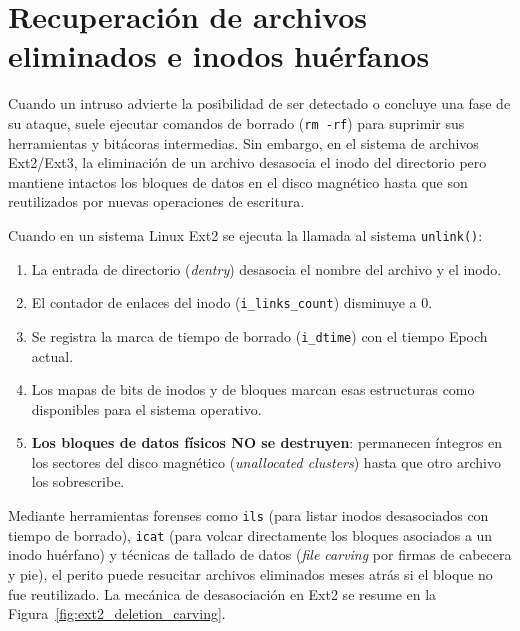\chapter{Recuperación de archivos eliminados e inodos huérfanos}

Cuando un intruso advierte la posibilidad de ser detectado o concluye una fase de su ataque, suele ejecutar comandos de borrado (\texttt{rm -rf}) para suprimir sus herramientas y bitácoras intermedias. Sin embargo, en el sistema de archivos Ext2/Ext3, la eliminación de un archivo desasocia el inodo del directorio pero mantiene intactos los bloques de datos en el disco magnético hasta que son reutilizados por nuevas operaciones de escritura.

\begin{notaforense}
Cuando en un sistema Linux Ext2 se ejecuta la llamada al sistema \texttt{unlink()}:
\begin{enumerate}
    \item La entrada de directorio (\textit{dentry}) desasocia el nombre del archivo y el inodo.
    \item El contador de enlaces del inodo (\texttt{i\_links\_count}) disminuye a 0.
    \item Se registra la marca de tiempo de borrado (\texttt{i\_dtime}) con el tiempo Epoch actual.
    \item Los mapas de bits de inodos y de bloques marcan esas estructuras como disponibles para el sistema operativo.
    \item \textbf{Los bloques de datos físicos NO se destruyen}: permanecen íntegros en los sectores del disco magnético (\textit{unallocated clusters}) hasta que otro archivo los sobrescribe.
\end{enumerate}
Mediante herramientas forenses como \texttt{ils} (para listar inodos desasociados con tiempo de borrado), \texttt{icat} (para volcar directamente los bloques asociados a un inodo huérfano) y técnicas de tallado de datos (\textit{file carving} por firmas de cabecera y pie), el perito puede resucitar archivos eliminados meses atrás si el bloque no fue reutilizado. La mecánica de desasociación en Ext2 se resume en la Figura~\ref{fig:ext2_deletion_carving}.
\end{notaforense}

